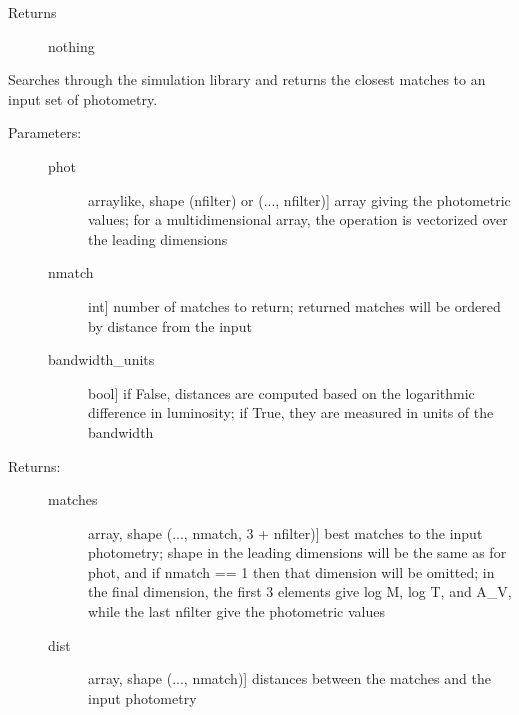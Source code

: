 \documentclass[letterpaper,10pt,english]{sphinxmanual}
\begin{document}
\begin{fulllineitems}
\begin{fulllineitems}
\begin{description}
\begin{description}
\end{description}

\item[{Returns}] \leavevmode
nothing

\end{description}

\end{fulllineitems}


\begin{fulllineitems}
\label{cluster_slug:slugpy.cluster_slug.cluster_slug.bestmatch}
Searches through the simulation library and returns the closest
matches to an input set of photometry.
\begin{description}
\item[{Parameters:}] \leavevmode\begin{description}
\item[{phot}] \leavevmode{[}arraylike, shape (nfilter) or (..., nfilter){]}
array giving the photometric values; for a
multidimensional array, the operation is vectorized over
the leading dimensions

\item[{nmatch}] \leavevmode{[}int{]}
number of matches to return; returned matches will be
ordered by distance from the input

\item[{bandwidth\_units}] \leavevmode{[}bool{]}
if False, distances are computed based on the
logarithmic difference in luminosity; if True, they are
measured in units of the bandwidth

\end{description}

\item[{Returns:}] \leavevmode\begin{description}
\item[{matches}] \leavevmode{[}array, shape (..., nmatch, 3 + nfilter){]}
best matches to the input photometry; shape in the
leading dimensions will be the same as for phot, and if
nmatch == 1 then that dimension will be omitted; in the
final dimension, the first 3 elements give log M, log T,
and A\_V, while the last nfilter give the photometric
values

\item[{dist}] \leavevmode{[}array, shape (..., nmatch){]}
distances between the matches and the input photometry


\end{description}
\end{description}
\end{fulllineitems}
\end{fulllineitems}
\end{document}
